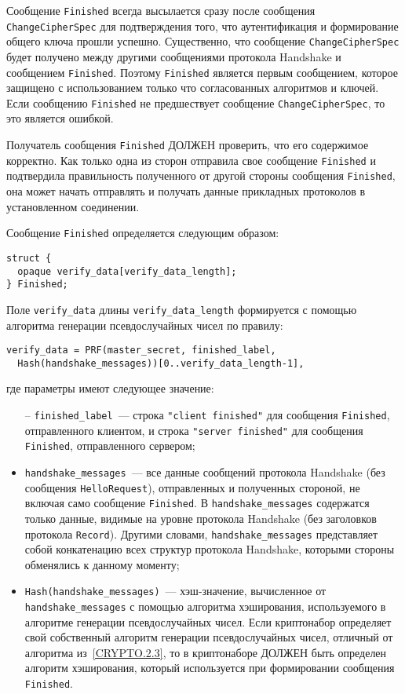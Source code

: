 Сообщение \lstinline{Finished} всегда высылается сразу после сообщения
\lstinline{ChangeCipherSpec} для подтверждения того, что аутентификация и
формирование общего ключа прошли успешно. Существенно, что сообщение
\lstinline{ChangeCipherSpec} будет получено между другими сообщениями
протокола Handshake и сообщением \lstinline{Finished}. Поэтому
\lstinline{Finished} является первым сообщением, которое защищено с
использованием только что согласованных алгоритмов и ключей. Если сообщению
\lstinline{Finished} не предшествует сообщение
\lstinline{ChangeCipherSpec}, то это является ошибкой.

Получатель сообщения \lstinline{Finished} ДОЛЖЕН проверить, что его
содержимое корректно. Как только одна из сторон отправила свое сообщение
\lstinline{Finished} и подтвердила правильность полученного от другой
стороны сообщения \lstinline{Finished}, она может начать отправлять и
получать данные прикладных протоколов в установленном соединении.

Сообщение \lstinline{Finished} определяется следующим образом: 
\begin{lstlisting}
struct {
  opaque verify_data[verify_data_length];
} Finished;
\end{lstlisting}

Поле \lstinline{verify_data} длины \lstinline{verify_data_length}
формируется с помощью алгоритма генерации  псевдослучайных чисел по
правилу:
\begin{lstlisting}
verify_data = PRF(master_secret, finished_label, 
  Hash(handshake_messages))[0..verify_data_length-1],
\end{lstlisting}
где параметры имеют следующее значение:
\begin{itemize}
\item[--]
\lstinline{finished_label}~--- строка \lstinline{"client finished"} для 
сообщения \lstinline{Finished}, отправленного клиентом, и строка 
\lstinline{"server finished"} для сообщения \lstinline{Finished}, 
отправленного сервером;   

\item[--]
\lstinline{handshake_messages}~--- все данные сообщений протокола 
Handshake (без сообщения \lstinline{HelloRequest}), отправленных и 
полученных стороной, не включая само сообщение \lstinline{Finished}. В 
\lstinline{handshake_messages} содержатся только данные, видимые на уровне 
протокола Handshake (без заголовков протокола 
\lstinline{Record}). Другими словами, \lstinline{handshake_messages}  
представляет собой конкатенацию всех структур протокола 
Handshake, которыми стороны обменялись к данному моменту;

\item[--]
\lstinline{Hash(handshake_messages)}~--- хэш-значение, вычисленное от 
\lstinline{handshake_messages} с помощью алгоритма хэширования, 
используемого в алгоритме генерации псевдослучайных чисел. Если 
криптонабор определяет свой собственный алгоритм генерации псевдослучайных 
чисел, отличный от алгоритма из~\ref{CRYPTO.2.3}, то в криптонаборе ДОЛЖЕН 
быть определен алгоритм хэширования, который используется при формировании 
сообщения \lstinline{Finished}.  
\end{itemize}

